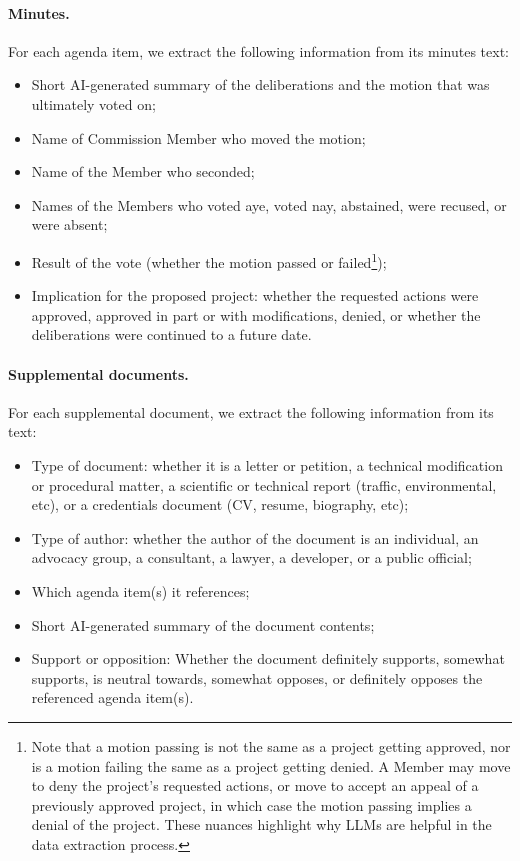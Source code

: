 \paragraph{Minutes.} For each agenda item, we extract the following information from its minutes text:
\begin{itemize}
\item Short AI-generated summary of the deliberations and the motion that was ultimately voted on;
\item Name of Commission Member who moved the motion;
\item Name of the Member who seconded;
\item Names of the Members who voted aye, voted nay, abstained, were recused, or were absent;
\item Result of the vote (whether the motion passed or failed\footnote{Note that a motion passing is not the same as a project getting approved, nor is a motion failing the same as a project getting denied. A Member may move to deny the project's requested actions, or move to accept an appeal of a previously approved project, in which case the motion passing implies a denial of the project. These nuances highlight why LLMs are helpful in the data extraction process.});
\item Implication for the proposed project: whether the requested actions were approved, approved in part or with modifications, denied, or whether the deliberations were continued to a future date.
\end{itemize}

\paragraph{Supplemental documents.} For each supplemental document, we extract the following information from its text:
\begin{itemize}
\item Type of document: whether it is a letter or petition, a technical modification or procedural matter, a scientific or technical report (traffic, environmental, etc), or a credentials document (CV, resume, biography, etc); 
\item Type of author: whether the author of the document is an individual, an advocacy group, a consultant, a lawyer, a developer, or a public official;
\item Which agenda item(s) it references;
\item Short AI-generated summary of the document contents;
\item Support or opposition: Whether the document definitely supports, somewhat supports, is neutral towards, somewhat opposes, or definitely opposes the referenced agenda item(s).
\end{itemize}

